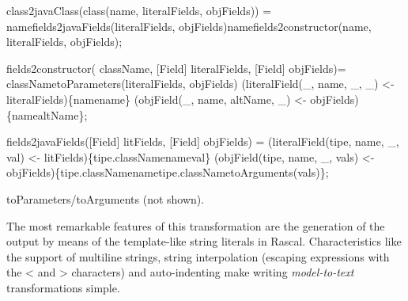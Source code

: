 \documentclass[submission,copyright,creativecommons]{eptcs}
\begin{document}
\begin{rascal}
 class2javaClass(class(name, literalFields, objFields)) =
    namefields2javaFields(literalFields, objFields)namefields2constructor(name, literalFields, objFields);
    
 fields2constructor( className, [Field] literalFields, [Field] objFields)=
    classNametoParameters(literalFields, objFields) (literalField(\_{}, name, \_{}, \_{}) \textless{}- literalFields)\{{}namename\}{} (objField(\_{}, name, altName, \_{}) \textless{}- objFields)\{{}namealtName\}{};
    
 fields2javaFields([Field] litFields, [Field] objFields) =
     (literalField(tipe, name, \_{}, val) \textless{}- litFields)\{{}tipe.classNamenameval\}{} (objField(tipe, name, \_{}, vals) \textless{}- objFields)\{{}tipe.classNamenametipe.classNametoArguments(vals)\}{};
\end{rascal}

toParameters/toArguments (not shown).


The most remarkable features of this transformation are the generation of the output by means of the template-like string literals in Rascal. Characteristics like the support of multiline strings, string interpolation (escaping expressions with the < and > characters) and auto-indenting make writing \emph{model-to-text} transformations simple.
\end{document}
